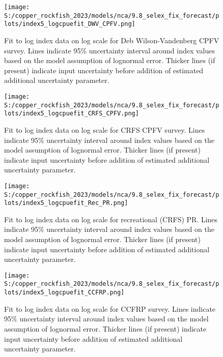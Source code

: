 \documentclass[11pt,
  english,
  letterpaper,
]{article}
\begin{document}
\pagebreak

\begin{figure}
\centering
\texttt{[image: S:/copper\_rockfish\_2023/models/nca/9.8\_selex\_fix\_forecast/plots/index5\_logcpuefit\_DWV\_CPFV.png]}
\caption{Fit to log index data on log scale for Deb Wilson-Vandenberg CPFV survey. Lines indicate 95\% uncertainty interval around index values based on the model assumption of lognormal error. Thicker lines (if present) indicate input uncertainty before addition of estimated additional uncertainty parameter.\label{fig:dwv-cpfv-index-fit}}
\end{figure}

\pagebreak

\begin{figure}
\centering
\texttt{[image: S:/copper\_rockfish\_2023/models/nca/9.8\_selex\_fix\_forecast/plots/index5\_logcpuefit\_CRFS\_CPFV.png]}
\caption{Fit to log index data on log scale for CRFS CPFV survey. Lines indicate 95\% uncertainty interval around index values based on the model assumption of lognormal error. Thicker lines (if present) indicate input uncertainty before addition of estimated additional uncertainty parameter.\label{fig:crfs-cpfv-index-fit}}
\end{figure}

\pagebreak

\begin{figure}
\centering
\texttt{[image: S:/copper\_rockfish\_2023/models/nca/9.8\_selex\_fix\_forecast/plots/index5\_logcpuefit\_Rec\_PR.png]}
\caption{Fit to log index data on log scale for recreational (CRFS) PR. Lines indicate 95\% uncertainty interval around index values based on the model assumption of lognormal error. Thicker lines (if present) indicate input uncertainty before addition of estimated additional uncertainty parameter.\label{fig:crfs-pr-index-fit}}
\end{figure}

\pagebreak

\begin{figure}
\centering
\texttt{[image: S:/copper\_rockfish\_2023/models/nca/9.8\_selex\_fix\_forecast/plots/index5\_logcpuefit\_CCFRP.png]}
\caption{Fit to log index data on log scale for CCFRP survey. Lines indicate 95\% uncertainty interval around index values based on the model assumption of lognormal error. Thicker lines (if present) indicate input uncertainty before addition of estimated additional uncertainty parameter.\label{fig:ccfrp-index-fit}}
\end{figure}
\end{document}
